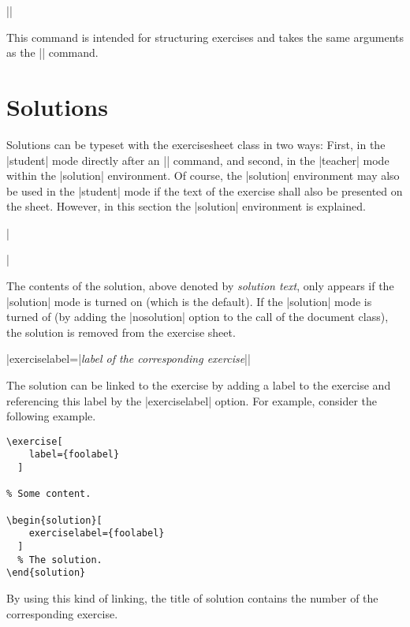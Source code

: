 \documentclass[a4paper,fleqn,9pt]{report}
\def\exercisesheet{{exercisesheet}}
\def\syntaxdefaultarg#1{\hfill\texttt{#1}\par\smallskip\noindent\ignorespaces}
\def\metaargument#1{\textit{#1}}
\begin{document}
\begin{syntax}
  |\subexercise[|\metaargument{key-value-list}|]| \syntaxdefaultarg{}
  This command is intended for structuring exercises and takes the
  same arguments as the |\exercise| command.
\end{syntax}

\section{Solutions}

Solutions can be typeset with the \exercisesheet{} class in two ways:
First, in the |student| mode directly after an |\exercise| command,
and second, in the |teacher| mode within the |solution|
environment. Of course, the |solution| environment may also be used in
the |student| mode if the text of the exercise shall also be presented
on the sheet. However, in this section the |solution| environment is
explained.

\begin{syntax}
  ||
  \syntaxdefaultarg{}
  The contents of the solution, above denoted by
  \metaargument{solution text}, only appears if the |solution| mode 
  is turned on (which is the default). If the |solution| mode is
  turned of (by adding the |nosolution| option to the call of the
  document class), the solution is removed from the exercise sheet.
  

  \begin{syntax}
    |exerciselabel={|\metaargument{label of the corresponding
    exercise}|}| \syntaxdefaultarg{}
    The solution can be linked to the exercise by adding a label to
    the exercise and referencing this label by the |exerciselabel|
    option. For example, consider the following example.
    \begin{lstlisting}
\exercise[
    label={foolabel}
  ]

% Some content.

\begin{solution}[
    exerciselabel={foolabel}
  ]
  % The solution.
\end{solution}

    \end{lstlisting}
    By using this kind of linking, the title of solution contains the
    number of the corresponding exercise.
  \end{syntax}
\end{syntax}
\end{document}
